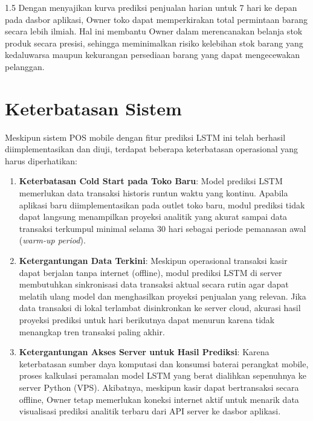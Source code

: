 \documentclass[12pt, a4paper, onecolumn, oneside]{report}
\begin{document}
\begin{spacing}{1.5}
Dengan menyajikan kurva prediksi penjualan harian untuk 7 hari ke depan pada dasbor aplikasi, Owner toko dapat memperkirakan total permintaan barang secara lebih ilmiah. Hal ini membantu Owner dalam merencanakan belanja stok produk secara presisi, sehingga meminimalkan risiko kelebihan stok barang yang kedaluwarsa maupun kekurangan persediaan barang yang dapat mengecewakan pelanggan.

\section{Keterbatasan Sistem}

Meskipun sistem POS mobile dengan fitur prediksi LSTM ini telah berhasil diimplementasikan dan diuji, terdapat beberapa keterbatasan operasional yang harus diperhatikan:

\begin{enumerate}
    \item \textbf{Keterbatasan Cold Start pada Toko Baru}:
    Model prediksi LSTM memerlukan data transaksi historis runtun waktu yang kontinu. Apabila aplikasi baru diimplementasikan pada outlet toko baru, modul prediksi tidak dapat langsung menampilkan proyeksi analitik yang akurat sampai data transaksi terkumpul minimal selama 30 hari sebagai periode pemanasan awal (\textit{warm-up period}).
    
    \item \textbf{Ketergantungan Data Terkini}:
    Meskipun operasional transaksi kasir dapat berjalan tanpa internet (offline), modul prediksi LSTM di server membutuhkan sinkronisasi data transaksi aktual secara rutin agar dapat melatih ulang model dan menghasilkan proyeksi penjualan yang relevan. Jika data transaksi di lokal terlambat disinkronkan ke server cloud, akurasi hasil proyeksi prediksi untuk hari berikutnya dapat menurun karena tidak menangkap tren transaksi paling akhir.
    
    \item \textbf{Ketergantungan Akses Server untuk Hasil Prediksi}:
    Karena keterbatasan sumber daya komputasi dan konsumsi baterai perangkat mobile, proses kalkulasi peramalan model LSTM yang berat dialihkan sepenuhnya ke server Python (VPS). Akibatnya, meskipun kasir dapat bertransaksi secara offline, Owner tetap memerlukan koneksi internet aktif untuk menarik data visualisasi prediksi analitik terbaru dari API server ke dasbor aplikasi.
\end{enumerate}

\end{spacing}
\end{document}
